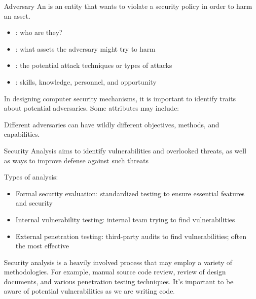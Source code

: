 \documentclass[12pt]{report}
\begin{document}
\begin{dfnbox}{Adversary}{}
    An  is an entity that wants to violate a security policy in order to harm an asset.
    \begin{itemize}[noitemsep]
        \item {}: who are they?
        \item {}: what assets the adversary might try to harm
        \item {}: the potential attack techniques or types of attacks
        \item {}: skills, knowledge, personnel, and opportunity
    \end{itemize}
\end{dfnbox}

In designing computer security mechanisms, it is important to identify traits about potential adversaries. Some attributes may include:


Different adversaries can have wildly different objectives, methods, and capabilities.

\begin{dfnbox}{Security Analysis}{}
     aims to identify vulnerabilities and overlooked threats, as well as ways to improve defense against such threats
\end{dfnbox}

Types of analysis:
\begin{itemize}
    \item Formal security evaluation: standardized testing to ensure essential features and security
    \item Internal vulnerability testing: internal team trying to find vulnerabilities
    \item External penetration testing: third-party audits to find vulnerabilities; often the most effective
\end{itemize}

Security analysis is a heavily involved process that may employ a variety of methodologies. For example, manual source code review, review of design documents, and various penetration testing techniques. It's important to be aware of potential vulnerabilities as we are writing code.
\end{document}
